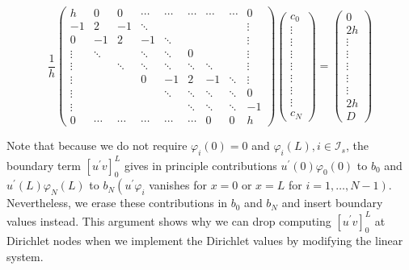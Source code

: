 \documentclass[../main.tex]{subfiles}
\begin{document}
	\begin{equation}
		\label{eqa184}	
		\frac{1}{h}\left(\begin{array}{ccccccccc}
			h & 0 & 0 & \cdots & \cdots & \cdots & \cdots & \cdots & 0 \\
			-1 & 2 & -1 & \ddots & & & & & \vdots \\
			0 & -1 & 2 & -1 & \ddots & & & & \vdots \\
			\vdots & \ddots & & \ddots & \ddots & 0 & & & \vdots \\
			\vdots & & \ddots & \ddots & \ddots & \ddots & \ddots & & \vdots \\
			\vdots & & & 0 & -1 & 2 & -1 & \ddots & \vdots \\
			\vdots & & & & \ddots & \ddots & \ddots & \ddots & 0 \\
			\vdots & & & & & \ddots & \ddots & \ddots & -1 \\
			0 & \cdots & \cdots & \cdots & \cdots & \cdots & 0 & 0 & h
		\end{array}\right)\left(\begin{array}{c}
			c_{0} \\
			\vdots \\
			\vdots \\
			\vdots \\
			\vdots \\
			\vdots \\
			\vdots \\
			\vdots \\
			c_{N}
		\end{array}\right)=\left(\begin{array}{c}
			0 \\
			2 h \\
			\vdots \\
			\vdots \\
			\vdots \\
			\vdots \\
			\vdots \\
			2 h \\
			D
		\end{array}\right)
	\end{equation}

		Note that because we do not require $\varphi_{i}(0)=0$ and $\varphi_{i}(L), i \in \mathcal{I}_{s}$, the boundary term $\left[u^{\prime} v\right]_{0}^{L}$ gives in principle contributions $u^{\prime}(0) \varphi_{0}(0)$ to $b_{0}$ and $u^{\prime}(L) \varphi_{N}(L)$ to $b_{N}\left(u^{\prime} \varphi_{i}\right.$ vanishes for $x=0$ or $x=L$ for $\left.i=1, \ldots, N-1\right)$. Nevertheless, we erase these contributions in $b_{0}$ and $b_{N}$ and insert boundary values instead. This argument shows why we can drop computing $\left[u^{\prime} v\right]_{0}^{L}$ at Dirichlet nodes when we implement the Dirichlet values by modifying the linear system.
		
\end{document}
